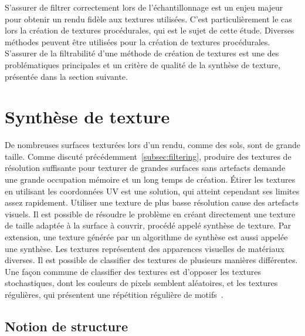 S'assurer de filtrer correctement lors de l'échantillonnage est un enjeu majeur pour obtenir un rendu fidèle aux textures utilisées. C'est particulièrement le cas lors la création de textures procédurales, qui est le sujet de cette étude. Diverses méthodes peuvent être utilisées pour la création de textures procédurales. S'assurer de la filtrabilité d'une méthode de création de textures est une des problématiques principales et un critère de qualité de la synthèse de texture, présentée dans la section suivante.


\section{Synthèse de texture}

De nombreuses surfaces texturées lors d'un rendu, comme des sols, sont de grande taille. Comme discuté précédemment~\ref{subsec:filtering}, produire des textures de résolution suffisante pour texturer de grandes surfaces sans artefacts demande une grande occupation mémoire et un long temps de création. Étirer les textures en utilisant les coordonnées UV est une solution, qui atteint cependant ses limites assez rapidement. Utiliser une texture de plus basse résolution cause des artefacts visuels. Il est possible de résoudre le problème en créant directement une texture de taille adaptée à la surface à couvrir, procédé appelé synthèse de texture. Par extension, une texture générée par un algorithme de synthèse est aussi appelée une synthèse. Les textures représentent des apparences visuelles de matériaux diverses. Il est possible de classifier des textures de plusieurs manières différentes. Une façon commune de classifier des textures est d'opposer les textures stochastiques, dont les couleurs de pixels semblent aléatoires, et les textures régulières, qui présentent une répétition régulière de motifs~\cite{liu_near-regular_2004}.

\subsection*{Notion de structure}
\label{subsec:structure}

